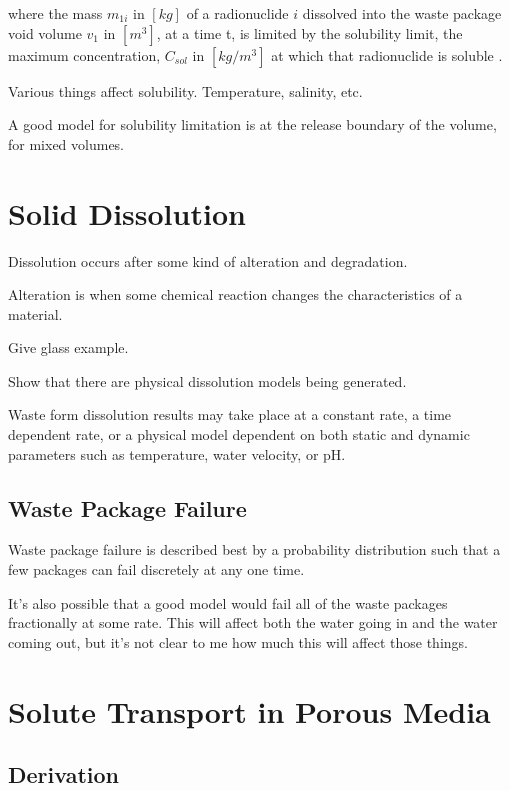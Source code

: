 \documentclass[letterpaper]{article}
\begin{document}
where the mass $m_{1i}$ in $[kg]$ of a radionuclide $i$ dissolved into the waste 
package
void volume $v_1$ in $[m^3]$, at a time t, is limited by the solubility limit, 
the maximum concentration, $C_{sol}$ in $[kg/m^3]$ at which that radionuclide is 
soluble \cite{hedin_integrated_2002}.

Various things affect solubility. Temperature, salinity, etc.

A good model for solubility limitation is at the release boundary of the volume, 
for mixed volumes.


\section{Solid Dissolution}

Dissolution occurs after some kind of alteration and degradation. 

Alteration is when some chemical reaction changes the characteristics  of a 
material. 

Give glass example. 

Show that there are physical dissolution models being generated. 

Waste form dissolution results may take place at a constant rate, a time 
dependent rate, or  a physical model dependent on both static and dynamic 
parameters such as temperature, water velocity, or pH. 

\subsection{Waste Package Failure}

Waste package failure is described best by a probability distribution such that 
a few packages can fail discretely at any one time. 


It's also possible that a good model would fail all of the waste packages 
fractionally at some rate. This will affect both the water going in and the 
water coming out, but it's not clear to me how much this will affect those 
things. 


\section{Solute Transport in Porous Media}

\subsection{Derivation \cite{van_genuchten_analytical_1982, 
leij_analytical_1991}}
\end{document}

